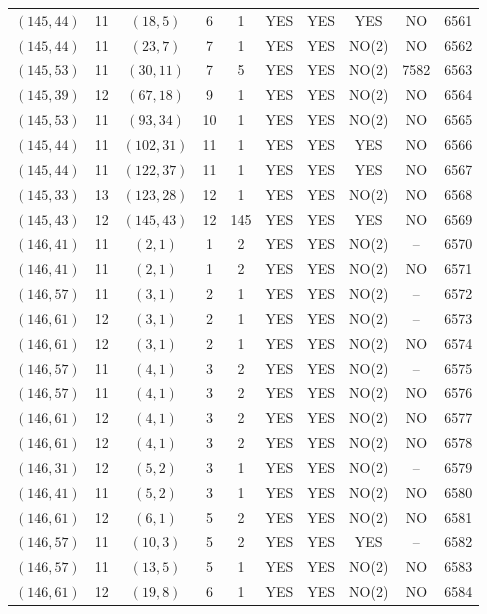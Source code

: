 \begin{longtable}{|c|c|c|c|c|c|c|c|c|c|}
$(145, 44)$ & 11 & $(18, 5)$ & 6 & 1 & YES & YES & YES & NO & 6561\\
$(145, 44)$ & 11 & $(23, 7)$ & 7 & 1 & YES & YES & NO(2) & NO & 6562\\
$(145, 53)$ & 11 & $(30, 11)$ & 7 & 5 & YES & YES & NO(2) & 7582 & 6563\\
$(145, 39)$ & 12 & $(67, 18)$ & 9 & 1 & YES & YES & NO(2) & NO & 6564\\
$(145, 53)$ & 11 & $(93, 34)$ & 10 & 1 & YES & YES & NO(2) & NO & 6565\\
$(145, 44)$ & 11 & $(102, 31)$ & 11 & 1 & YES & YES & YES & NO & 6566\\
$(145, 44)$ & 11 & $(122, 37)$ & 11 & 1 & YES & YES & YES & NO & 6567\\
$(145, 33)$ & 13 & $(123, 28)$ & 12 & 1 & YES & YES & NO(2) & NO & 6568\\
$(145, 43)$ & 12 & $(145, 43)$ & 12 & 145 & YES & YES & YES & NO & 6569\\
$(146, 41)$ & 11 & $(2, 1)$ & 1 & 2 & YES & YES & NO(2) & -- & 6570\\
$(146, 41)$ & 11 & $(2, 1)$ & 1 & 2 & YES & YES & NO(2) & NO & 6571\\
$(146, 57)$ & 11 & $(3, 1)$ & 2 & 1 & YES & YES & NO(2) & -- & 6572\\
$(146, 61)$ & 12 & $(3, 1)$ & 2 & 1 & YES & YES & NO(2) & -- & 6573\\
$(146, 61)$ & 12 & $(3, 1)$ & 2 & 1 & YES & YES & NO(2) & NO & 6574\\
$(146, 57)$ & 11 & $(4, 1)$ & 3 & 2 & YES & YES & NO(2) & -- & 6575\\
$(146, 57)$ & 11 & $(4, 1)$ & 3 & 2 & YES & YES & NO(2) & NO & 6576\\
$(146, 61)$ & 12 & $(4, 1)$ & 3 & 2 & YES & YES & NO(2) & NO & 6577\\
$(146, 61)$ & 12 & $(4, 1)$ & 3 & 2 & YES & YES & NO(2) & NO & 6578\\
$(146, 31)$ & 12 & $(5, 2)$ & 3 & 1 & YES & YES & NO(2) & -- & 6579\\
$(146, 41)$ & 11 & $(5, 2)$ & 3 & 1 & YES & YES & NO(2) & NO & 6580\\
$(146, 61)$ & 12 & $(6, 1)$ & 5 & 2 & YES & YES & NO(2) & NO & 6581\\
$(146, 57)$ & 11 & $(10, 3)$ & 5 & 2 & YES & YES & YES & -- & 6582\\
$(146, 57)$ & 11 & $(13, 5)$ & 5 & 1 & YES & YES & NO(2) & NO & 6583\\
$(146, 61)$ & 12 & $(19, 8)$ & 6 & 1 & YES & YES & NO(2) & NO & 6584\\

\end{longtable}
